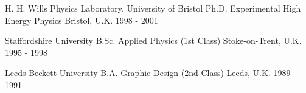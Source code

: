 

\begin{cventries}

    \award
    {H. H. Wills Physics Laboratory, University of Bristol} %
    {Ph.D. Experimental High Energy Physics} %
    {Bristol, U.K.} %
    {1998 - 2001} %
    {}

    \award
    {Staffordshire University} %
    {B.Sc. Applied Physics (1st Class)} %
    {Stoke-on-Trent, U.K.} %
    {1995 - 1998} %
    {}

    \award
    {Leeds Beckett University} %
    {B.A. Graphic Design (2nd Class)} %
    {Leeds, U.K.} %
    {1989 - 1991} %
    {}

\end{cventries}